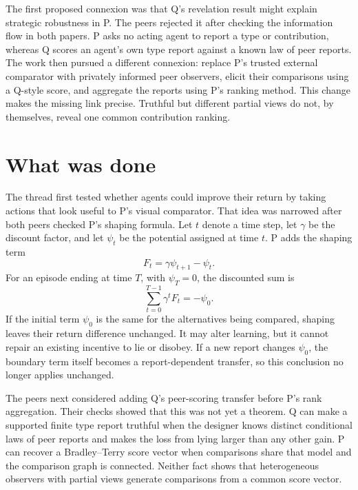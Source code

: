 \documentclass{article}
\begin{document}
The first proposed connexion was that Q's revelation result might explain strategic robustness in P.  The peers rejected it after checking the information flow in both papers.  P asks no acting agent to report a type or contribution, whereas Q scores an agent's own type report against a known law of peer reports.  The work then pursued a different connexion: replace P's trusted external comparator with privately informed peer observers, elicit their comparisons using a Q-style score, and aggregate the reports using P's ranking method.  This change makes the missing link precise.  Truthful but different partial views do not, by themselves, reveal one common contribution ranking.

\section{What was done}

The thread first tested whether agents could improve their return by taking actions that look useful to P's visual comparator.  That idea was narrowed after both peers checked P's shaping formula.  Let $t$ denote a time step, let $\gamma$ be the discount factor, and let $\psi_t$ be the potential assigned at time $t$.  P adds the shaping term
\begin{equation}
F_t=\gamma\psi_{t+1}-\psi_t.
\end{equation}
For an episode ending at time $T$, with $\psi_T=0$, the discounted sum is
\begin{equation}
\sum_{t=0}^{T-1}\gamma^t F_t=-\psi_0.
\end{equation}
If the initial term $\psi_0$ is the same for the alternatives being compared, shaping leaves their return difference unchanged.  It may alter learning, but it cannot repair an existing incentive to lie or disobey.  If a new report changes $\psi_0$, the boundary term itself becomes a report-dependent transfer, so this conclusion no longer applies unchanged.

The peers next considered adding Q's peer-scoring transfer before P's rank aggregation.  Their checks showed that this was not yet a theorem.  Q can make a supported finite type report truthful when the designer knows distinct conditional laws of peer reports and makes the loss from lying larger than any other gain.  P can recover a Bradley--Terry score vector when comparisons share that model and the comparison graph is connected.  Neither fact shows that heterogeneous observers with partial views generate comparisons from a common score vector.
\end{document}
